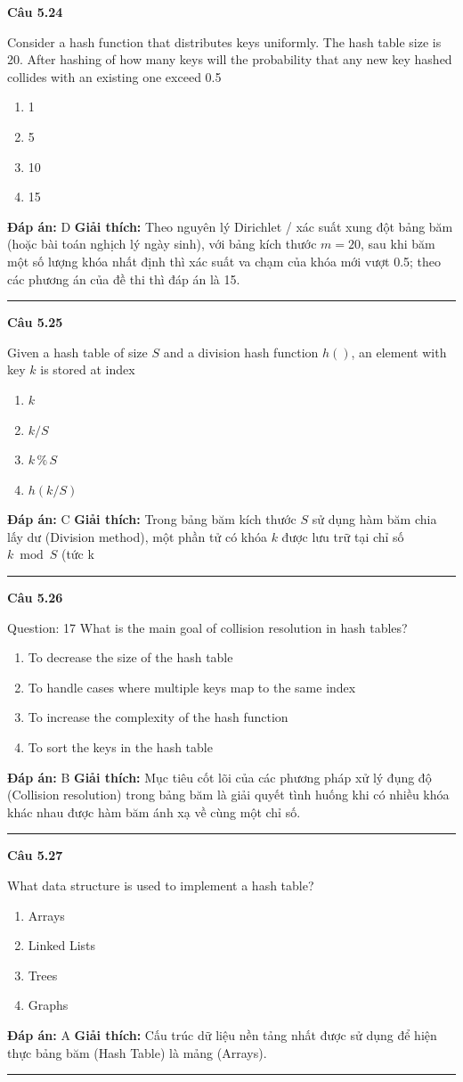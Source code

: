 \documentclass[11pt,a4paper]{article}
\newenvironment{question}[1]{%
  \par\vspace{1em}\noindent\textbf{\large Câu #1}\par\vspace{0.4em}
}{%
  \par\vspace{1em}\hrule\vspace{0.6em}
}
\newenvironment{choices}{%
  \begin{enumerate}[label=\textbf{\Alph*.},leftmargin=2.2em,itemsep=2pt,topsep=3pt]
}{%
  \end{enumerate}
}
\newcommand{\choice}{\item}
\begin{document}
\begin{question}{5.24}
Consider a hash function that distributes keys uniformly. The hash table size is 20. After hashing of how many keys will the probability that any new key hashed collides with an existing one exceed 0.5
\begin{choices}
\choice 1
\choice 5
\choice 10
\choice 15
\end{choices}
\textbf{Đáp án:} D
\textbf{Giải thích:} Theo nguyên lý Dirichlet / xác suất xung đột bảng băm (hoặc bài toán nghịch lý ngày sinh), với bảng kích thước \(m = 20\), sau khi băm một số lượng khóa nhất định thì xác suất va chạm của khóa mới vượt 0.5; theo các phương án của đề thi thì đáp án là 15.
\end{question}

\begin{question}{5.25}
Given a hash table of size \(S\) and a division hash function \(h()\), an element with key \(k\) is stored at index
\begin{choices}
\choice \(k\)
\choice \(k/S\)
\choice \(k\,\%\,S\)
\choice \(h(k/S)\)
\end{choices}
\textbf{Đáp án:} C
\textbf{Giải thích:} Trong bảng băm kích thước \(S\) sử dụng hàm băm chia lấy dư (Division method), một phần tử có khóa \(k\) được lưu trữ tại chỉ số \(k \bmod S\) (tức k %
\end{question}

\begin{question}{5.26}
Question: 17 What is the main goal of collision resolution in hash tables?
\begin{choices}
\choice To decrease the size of the hash table
\choice To handle cases where multiple keys map to the same index
\choice To increase the complexity of the hash function
\choice To sort the keys in the hash table
\end{choices}
\textbf{Đáp án:} B
\textbf{Giải thích:} Mục tiêu cốt lõi của các phương pháp xử lý đụng độ (Collision resolution) trong bảng băm là giải quyết tình huống khi có nhiều khóa khác nhau được hàm băm ánh xạ về cùng một chỉ số.
\end{question}

\begin{question}{5.27}
What data structure is used to implement a hash table?
\begin{choices}
\choice Arrays
\choice Linked Lists
\choice Trees
\choice Graphs
\end{choices}
\textbf{Đáp án:} A
\textbf{Giải thích:} Cấu trúc dữ liệu nền tảng nhất được sử dụng để hiện thực bảng băm (Hash Table) là mảng (Arrays).
\end{question}
\end{document}
